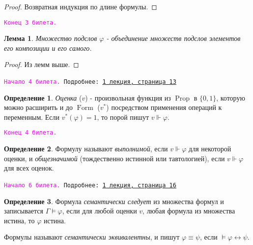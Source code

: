 \documentclass[a4paper,100pt]{article}
\theoremstyle{indented}
\newtheorem{lemma}{Лемма}
\theoremstyle{definition}
\newtheorem{defn}{Определение}
\theoremstyle{remark}
\DeclareMathOperator{\Prop}{Prop}
\DeclareMathOperator{\form}{Form}
\begin{document}
\begin{proof}
  Возвратная индукция по длине формулы.
\end{proof}

\texttt{\textcolor{magenta}{Конец 3 билета.}} 

\hrulefill

\begin{lemma}
  Множество подслов $\varphi$ - объединение множеств подслов элементов его композиции и его самого.
\end{lemma}

\begin{proof}
  Из лемм выше.
\end{proof}

\hrulefill

\texttt{\hypertarget{b4}{\textcolor{magenta}{Начало 4 билета.}} Подробнее: \href{http://www.mi-ras.ru/~speranski/courses/logic-1-2021-spring/slides_1.pdf}{1 лекция, страница 13}} \

\begin{defn}
  \textit{Оценка} ($v$) - произвольная функция из $\Prop$ в $\{0, 1\}$, которую можно расширить и до $\form$ ($v^*$) посредством применения операций к переменным. Если $v^*(\varphi)=1$, то порой пишут $v \Vdash \varphi$.
\end{defn}

\texttt{\textcolor{magenta}{Конец 4 билета.}} 

\hrulefill

\begin{defn}
  Формулу называют \textit{выполнимой}, если $v \Vdash \varphi$ для некоторой оценки, и \textit{общезначимой} (тождественно истинной или тавтологией), если $v \Vdash \varphi$ для всех оценок.
\end{defn}

\hrulefill

\texttt{\hypertarget{b6}{\textcolor{magenta}{Начало 6 билета.}} Подробнее: \href{http://www.mi-ras.ru/~speranski/courses/logic-1-2021-spring/slides_1.pdf}{1 лекция, страница 16}} \

\begin{defn}
  Формула \textit{семантически следует} из множества формул и записывается $\Gamma \vDash \varphi$, если для любой оценки $v$, любая формула из множества истина, то $\varphi$ истина.  \ 
  
  Формулы называют \textit{семантически эквивалентны}, и пишут $\varphi \equiv \psi$, если $\vDash \varphi \leftrightarrow \psi$. 
\end{defn}
\end{document}
